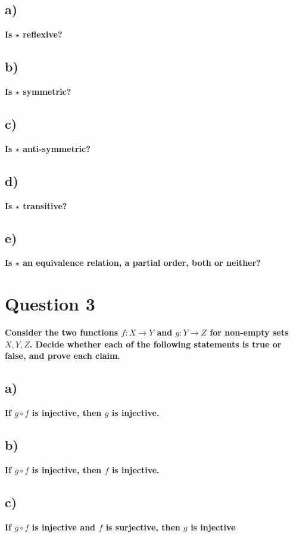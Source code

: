 \documentclass{article}
\begin{document}
\subsection{a)}
\textbf{ Is $\star $ reflexive? }
\newpage
\subsection{b)}
\textbf{Is $\star $ symmetric?}
\newpage
\subsection{c)}
\textbf{Is $\star $ anti-symmetric? }
\newpage
\subsection{d)}
\textbf{ Is $\star $ transitive?}
\newpage
\subsection{e)}
\textbf{ Is $\star $ an equivalence relation, a partial order, both or neither?}
\newpage
\section{Question 3}
\textbf{ Consider the two functions $f: X \rightarrow Y$ and $g: Y \rightarrow Z$ for non-empty sets $X, Y, Z$.
Decide whether each of the following statements is true or false, and prove each claim.}
\subsection{a)}
\textbf{ If $g \circ f$ is injective, then $g$ is injective.}
\newpage
\subsection{b)}
\textbf{ If $g \circ f$ is injective, then $f$ is injective. }
\newpage
\subsection{c)}
\textbf{ If $g \circ f$ is injective and $f$ is surjective, then $g$ is injective}
\end{document}
